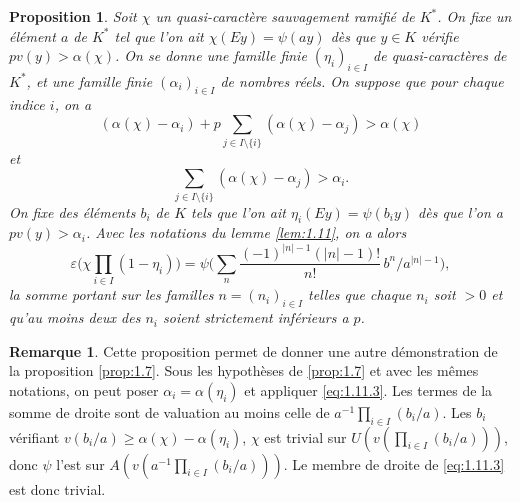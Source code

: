 \documentclass[12pt,a4paper]{article}
\theoremstyle{plain}
\newtheorem{proposition}[theorem]{Proposition}
\theoremstyle{definition}
\newtheorem{remark}[theorem]{Remarque}
\theoremstyle{remark}
\begin{document}
\begin{proposition}\label{prop:1.11}
Soit $\chi$ un quasi-caract\`ere sauvagement ramifi\'e de $K^*$. On fixe un \'el\'ement $a$ de $K^*$ tel que l'on ait $\chi(Ey) = \psi(ay)$ d\`es que $y \in K$ v\'erifie $pv(y) > \alpha(\chi)$. On se donne une famille finie $(\eta_i)_{i \in I}$ de quasi-caract\`eres de $K^*$, et une famille finie $(\alpha_i)_{i \in I}$ de nombres r\'eels. On suppose que pour chaque indice $i$, on a
\[
(\alpha(\chi) - \alpha_i) + p \sum_{j \in I \setminus \{i\}} (\alpha(\chi) - \alpha_j) > \alpha(\chi)
\]
et
\[
\sum_{j \in I \setminus \{i\}} (\alpha(\chi) - \alpha_j) > \alpha_i.
\]
On fixe des \'el\'ements $b_i$ de $K$ tels que l'on ait $\eta_i(Ey) = \psi(b_i y)$ d\`es que l'on a $pv(y) > \alpha_i$. Avec les notations du lemme \ref{lem:1.11}, on a alors
\begin{equation}\label{eq:1.11.3}
\varepsilon\biggl(\chi \prod_{i \in I}(1-\eta_i)\biggr) = \psi\biggl(\sum_n \frac{(-1)^{|n|-1}(|n|-1)!}{n!} \, b^n/a^{|n|-1}\biggr),
\end{equation}
la somme portant sur les familles $n = (n_i)_{i \in I}$ telles que chaque $n_i$ soit $> 0$ et qu'au moins deux des $n_i$ soient strictement inf\'erieurs a $p$.
\end{proposition}

\begin{remark}
Cette proposition permet de donner une autre d\'emonstration de la proposition \ref{prop:1.7}. Sous les hypoth\`eses de \ref{prop:1.7} et avec les m\^emes notations, on peut poser $\alpha_i = \alpha(\eta_i)$ et appliquer \eqref{eq:1.11.3}. Les termes de la somme de droite sont de valuation au moins celle de $a^{-1} \prod_{i \in I}(b_i/a)$. Les $b_i$ v\'erifiant $v(b_i/a) \geq \alpha(\chi) - \alpha(\eta_i)$, $\chi$ est trivial sur $U(v(\prod_{i \in I}(b_i/a)))$, donc $\psi$ l'est sur $A(v(a^{-1}\prod_{i \in I}(b_i/a)))$. Le membre de droite de \eqref{eq:1.11.3} est donc trivial.
\end{remark}

\subsection{}
\label{sec:1.12}
\end{document}
